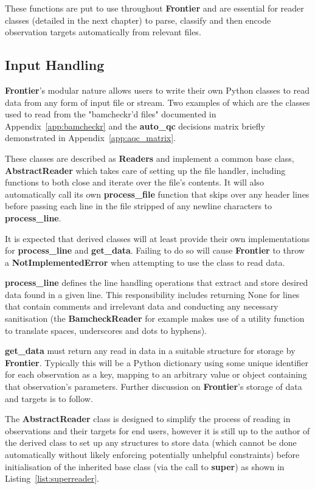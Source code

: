 These functions are put to use throughout \textbf{Frontier} and are essential for reader
classes (detailed in the next chapter) to parse, classify and then encode
observation targets automatically from relevant files.


\subsection{Input Handling}
\label{sec:frontier-input}

\textbf{Frontier}'s modular nature allows users to write their own Python classes to read
data from any form of input file or stream. Two examples of which are the
classes used to read from the "bamcheckr'd files" documented in
Appendix~\ref{app:bamcheckr} and the \textbf{auto\_qc} decisions matrix briefly
demonstrated in Appendix~\ref{app:aqc_matrix}.

These classes are described as \textbf{Readers} and implement a common base
class, \textbf{AbstractReader} which takes care of
setting up the file handler, including functions to both close and iterate over
the file's contents. It will also automatically call its own
\textbf{process\_file} function that skips over any header lines before passing
each line in the file stripped of any newline characters to \textbf{process\_line}.

It is expected that derived classes will at least provide their own
implementations for \textbf{process\_line} and \textbf{get\_data}. Failing to do
so will cause \textbf{Frontier} to throw a \textbf{NotImplementedError} when attempting
to use the class to read data.

\textbf{process\_line} defines the line handling operations that extract and store
desired data found in a given line. This responsibility includes returning None
for lines that contain comments and irrelevant data and conducting any necessary
sanitisation (the \textbf{BamcheckReader} for example makes use of a utility
function to translate spaces, underscores and dots to hyphens).

\textbf{get\_data} must return any read in data in a suitable structure for
storage by \textbf{Frontier}. Typically this will be a Python dictionary using some
unique identifier for each observation as a key, mapping to an arbitrary value
or object containing that observation's parameters. Further discussion on
\textbf{Frontier}'s storage of data and targets is to follow.

The \textbf{AbstractReader} class is designed to simplify the process of reading
in observations and their targets for end users, however it is still up to the
author of the derived class to set up any structures to store data (which cannot
be done automatically without likely enforcing potentially unhelpful
constraints) before initialisation of the inherited base class (via the call to
\textbf{super}) as shown in Listing~\ref{list:superreader}.


